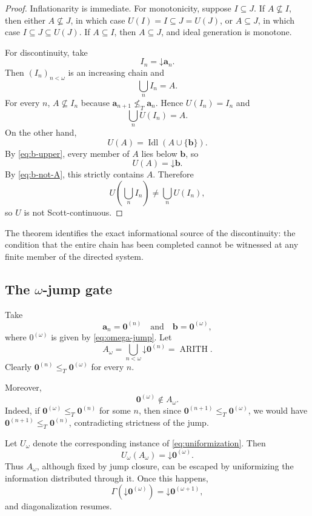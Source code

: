 \documentclass[11pt]{article}
\theoremstyle{definition}
\theoremstyle{remark}
\newcommand{\Arith}{\operatorname{ARITH}}
\newcommand{\down}{\mathord{\downarrow}}
\newcommand{\leT}{\leq_T}
\begin{document}
\begin{proof}
Inflationarity is immediate. For monotonicity, suppose $I\subseteq J$. If $A\nsubseteq I$, then either $A\nsubseteq J$, in which case
$U(I)=I\subseteq J=U(J)$, or $A\subseteq J$, in which case
$I\subseteq J\subseteq U(J)$. If $A\subseteq I$, then $A\subseteq J$, and ideal generation is monotone.

For discontinuity, take
\[
I_n=\down\mathbf a_n.
\]
Then $(I_n)_{n<\omega}$ is an increasing chain and
\[
\bigcup_nI_n=A.
\]
For every $n$, $A\nsubseteq I_n$ because $\mathbf a_{n+1}\not\leT\mathbf a_n$. Hence $U(I_n)=I_n$ and
\begin{equation}
\bigcup_nU(I_n)=A.
\label{eq:U-union}
\end{equation}
On the other hand,
\[
U(A)=\operatorname{Idl}(A\cup\{\mathbf b\}).
\]
By \eqref{eq:b-upper}, every member of $A$ lies below $\mathbf b$, so
\[
U(A)=\down\mathbf b.
\]
By \eqref{eq:b-not-A}, this strictly contains $A$. Therefore
\[
U\!\left(\bigcup_nI_n\right)
\neq
\bigcup_nU(I_n),
\]
so $U$ is not Scott-continuous.
\end{proof}

The theorem identifies the exact informational source of the discontinuity: the condition that the entire chain has been completed cannot be witnessed at any finite member of the directed system.

\subsection{The \texorpdfstring{$\omega$}{omega}-jump gate}

Take
\[
\mathbf a_n=\mathbf0^{(n)}
\quad\text{and}\quad
\mathbf b=\mathbf0^{(\omega)},
\]
where $0^{(\omega)}$ is given by \eqref{eq:omega-jump}. Let
\[
A_\omega
=
\bigcup_{n<\omega}\down\mathbf0^{(n)}
=
\Arith.
\]
Clearly $\mathbf0^{(n)}\leT\mathbf0^{(\omega)}$ for every $n$.

Moreover,
\begin{equation}
\mathbf0^{(\omega)}\notin A_\omega.
\label{eq:omega-not-arith}
\end{equation}
Indeed, if $\mathbf0^{(\omega)}\leT\mathbf0^{(n)}$ for some $n$, then since
$\mathbf0^{(n+1)}\leT\mathbf0^{(\omega)}$, we would have
$\mathbf0^{(n+1)}\leT\mathbf0^{(n)}$, contradicting strictness of the jump.

Let $U_\omega$ denote the corresponding instance of \eqref{eq:uniformization}. Then
\begin{equation}
U_\omega(A_\omega)=\down\mathbf0^{(\omega)}.
\label{eq:omega-gate-fires}
\end{equation}
Thus $A_\omega$, although fixed by jump closure, can be escaped by uniformizing the information distributed through it. Once this happens,
\[
\Gamma(\down\mathbf0^{(\omega)})
=
\down\mathbf0^{(\omega+1)},
\]
and diagonalization resumes.
\end{document}

